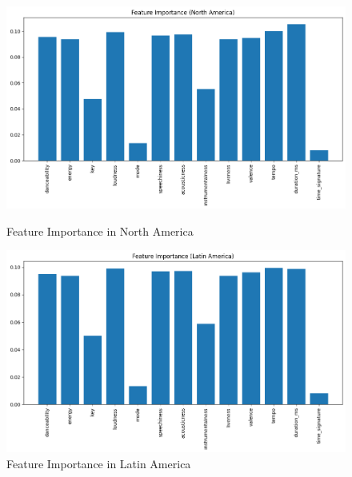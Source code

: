 \begin{figure}[h]
    \centering
    \begin{minipage}{0.45\textwidth}
        \centering
        \includegraphics[width=\linewidth]{media/rf_feature_imp_north_america.png}
        \caption{Feature Importance in North America}
    \end{minipage}%
    \hspace{0.05\textwidth} %
    \begin{minipage}{0.45\textwidth}
        \centering
        \includegraphics[width=\linewidth]{media/rf_feature_imp_latin_america.png}
        \caption{Feature Importance in Latin America}
    \end{minipage}
\end{figure}
